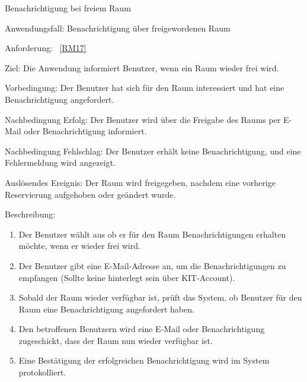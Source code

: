 \begin{function}{60}{Benachrichtigung bei freiem Raum}
    \item[Anwendungsfall:] Benachrichtigung über freigewordenen Raum
    \item[Anforderung:] ~\ref{RM17}
    \item[Ziel:] Die Anwendung informiert Benutzer, wenn ein Raum wieder frei wird.
    \item[Vorbedingung:] Der Benutzer hat sich für den Raum interessiert und hat eine Benachrichtigung angefordert.
    \item[Nachbedingung Erfolg:] Der Benutzer wird über die Freigabe des Raums per E-Mail oder Benachrichtigung informiert.
    \item[Nachbedingung Fehlschlag:] Der Benutzer erhält keine Benachrichtigung, und eine Fehlermeldung wird angezeigt.
    \item[Auslösendes Ereignis:] Der Raum wird freigegeben, nachdem eine vorherige Reservierung aufgehoben oder geändert wurde.
    \item[Beschreibung:] ~
    \begin{enumerate}
        \item Der Benutzer wählt aus ob er für den Raum Benachrichtigungen erhalten möchte, wenn er wieder frei wird.
        \item Der Benutzer gibt eine E-Mail-Adresse an, um die Benachrichtigungen zu empfangen (Sollte keine hinterlegt sein über KIT-Account).
        \item Sobald der Raum wieder verfügbar ist, prüft das System, ob Benutzer für den Raum eine Benachrichtigung angefordert haben.
        \item Den betroffenen Benutzern wird eine E-Mail oder Benachrichtigung zugeschickt, dass der Raum nun wieder verfügbar ist.
        \item Eine Bestätigung der erfolgreichen Benachrichtigung wird im System protokolliert.
    \end{enumerate}
\end{function}

\pagebreak

